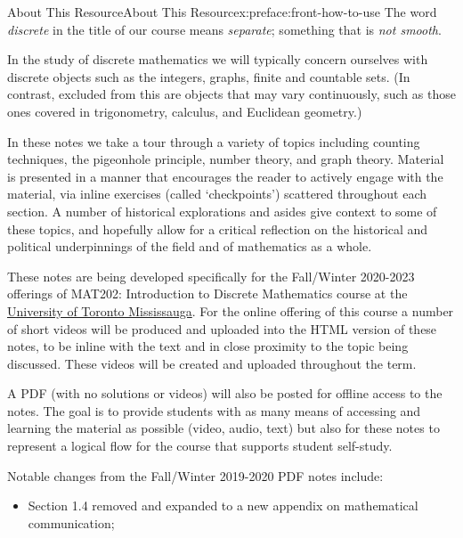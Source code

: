 \documentclass[oneside,10pt,]{book}
\numberwithin{equation}{section}
\begin{document}
%
%
\typeout{************************************************}
\typeout{************************************************}
%
\begin{preface}{About This Resource}{}{About This Resource}{}{}{x:preface:front-how-to-use}
The word \emph{discrete} in the title of our course means \emph{separate}; something that is \emph{not smooth}.%
\par
In the study of discrete mathematics we will typically concern ourselves with discrete objects such as the integers, graphs, finite and countable sets. (In contrast, excluded from this are objects that may vary continuously, such as those ones covered in trigonometry, calculus, and Euclidean geometry.)%
\par
In these notes we take a tour through a variety of topics including counting techniques, the pigeonhole principle, number theory, and graph theory. Material is presented in a manner that encourages the reader to actively engage with the material, via inline exercises (called `checkpoints') scattered throughout each section. A number of historical explorations and asides give context to some of these topics, and hopefully allow for a critical reflection on the historical and political underpinnings of the field and of mathematics as a whole.%
\par
These notes are being developed specifically for the Fall\slash{}Winter 2020-2023 offerings of MAT202: Introduction to Discrete Mathematics course at the \href{https://www.utm.utoronto.ca/math-cs-stats/home}{University of Toronto Mississauga}. For the online offering of this course a number of short videos will be produced and uploaded into the HTML version of these notes, to be inline with the text and in close proximity to the topic being discussed. These videos will be created and uploaded throughout the term.%
\par
A PDF (with no solutions or videos) will also be posted for offline access to the notes. The goal is to provide students with as many means of accessing and learning the material as possible (video, audio, text) but also for these notes to represent a logical flow for the course that supports student self-study.%
\par
Notable changes from the Fall\slash{}Winter 2019-2020 PDF notes include:%
\begin{itemize}[label=\textbullet]
\item{}Section 1.4 removed and expanded to a new appendix on mathematical communication;%

\end{itemize}
\end{preface}
\end{document}
